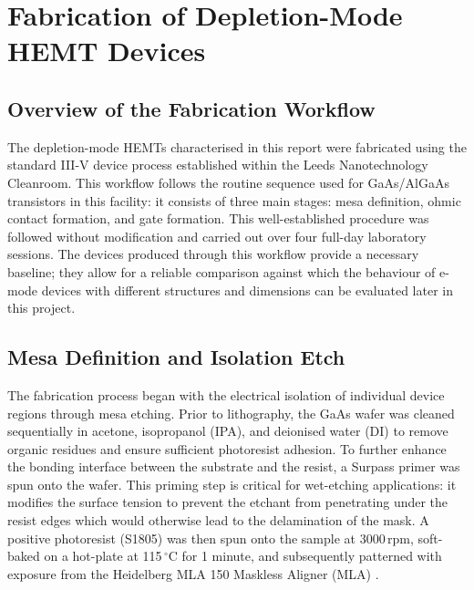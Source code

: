 \chapter{Fabrication of Depletion-Mode HEMT Devices}
\label{ch:baseline-process}

\section{Overview of the Fabrication Workflow}

The depletion-mode HEMTs characterised in this report were fabricated using 
the standard III-V device process established within the Leeds Nanotechnology 
Cleanroom. This workflow follows the routine sequence used for 
GaAs/AlGaAs transistors in this facility: it consists of three main stages: mesa definition, 
ohmic contact formation, and gate formation. 
This well-established procedure was followed without modification and carried 
out over four full-day laboratory sessions. The devices produced 
through this workflow provide a necessary baseline; they allow for a reliable 
comparison against which the behaviour of e-mode devices with different structures 
and dimensions can be evaluated later in this project.

\vspace{1mm}



\section{Mesa Definition and Isolation Etch}

The fabrication process began with the electrical isolation of individual 
device regions through mesa etching. Prior to lithography, the 
GaAs wafer was cleaned sequentially in acetone, isopropanol (IPA), and 
deionised water (DI) to remove organic residues and ensure sufficient 
photoresist adhesion. To further enhance the bonding interface 
between the substrate and the resist, a Surpass primer was spun onto the 
wafer. This priming step is critical for wet-etching applications: it 
modifies the surface tension to prevent the etchant from penetrating under 
the resist edges which would otherwise 
lead to the delamination of the mask. A positive photoresist (S1805) was 
then spun onto the sample at 3000\,rpm, soft-baked on a hot-plate at 115\,$^{\circ}$C for 1 minute, 
and subsequently patterned with exposure from the Heidelberg MLA 150 
Maskless Aligner (MLA) \cite{leedscleanroom_equipment}.

